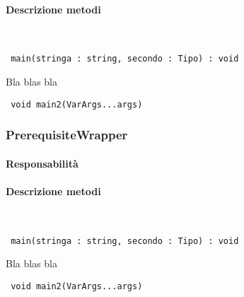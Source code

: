 					\paragraph{Descrizione metodi} \ \par
					
						
						\begin{lstlisting}
 main(stringa : string, secondo : Tipo) : void
						\end{lstlisting}
						Bla blas bla 
						
						\begin{lstlisting}
 void main2(VarArgs...args)
						\end{lstlisting}
				
					
				\subsubsection{PrerequisiteWrapper}
				
				
					\paragraph{Responsabilità}
					
					\paragraph{Descrizione metodi} \ \par
					
						
						\begin{lstlisting}
 main(stringa : string, secondo : Tipo) : void
						\end{lstlisting}
						Bla blas bla 
						
						\begin{lstlisting}
 void main2(VarArgs...args)
						\end{lstlisting}
	
